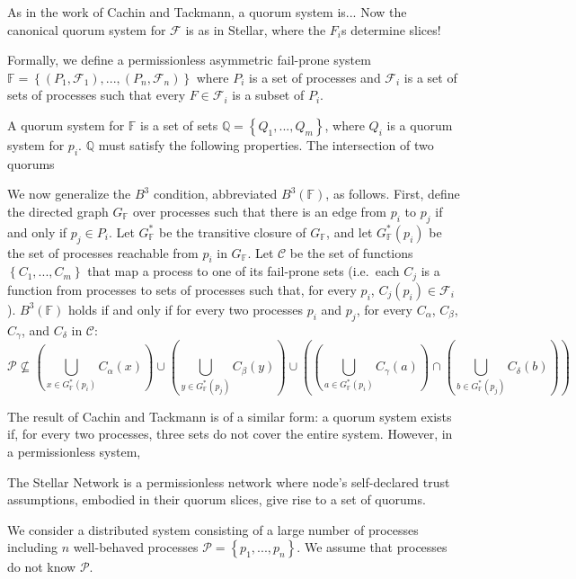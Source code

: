 \documentclass[11pt]{article}
\begin{document}
As in the work of Cachin and Tackmann, a quorum system is... Now the canonical quorum system for $\mathcal{F}$ is as in Stellar, where the $F_i$s determine slices!

Formally, we define a permissionless asymmetric fail-prone system $\mathbb{F}=\left\{\left(P_1,\mathcal{F}_1\right),...,\left(P_n,\mathcal{F}_n\right)\right\}$ where $P_i$ is a set of processes and $\mathcal{F}_i$ is a set of sets of processes such that every $F\in\mathcal{F}_i$ is a subset of $P_i$.

A quorum system for $\mathbb{F}$ is a set of sets $\mathbb{Q}=\left\{Q_1,...,Q_m\right\}$, where $Q_i$ is a quorum system for $p_i$. $\mathbb{Q}$ must satisfy the following properties. The intersection of two quorums

  We now generalize the $B^3$ condition, abbreviated $B^3(\mathbb{F})$, as follows. First, define the directed graph $G_\mathbb{F}$ over processes such that there is an edge from $p_i$ to $p_j$ if and only if $p_j\in P_i$. Let $G_\mathbb{F}^*$ be the transitive closure of $G_\mathbb{F}$, and let $G_\mathbb{F}^*(p_i)$ be the set of processes reachable from $p_i$ in $G_\mathbb{F}$. Let $\mathcal{C}$ be the set of functions $\left\{C_1,...,C_m\right\}$ that map a process to one of its fail-prone sets (i.e.\ each $C_j$ is a function from processes to sets of processes such that, for every $p_i$, $C_j(p_i)\in \mathcal{F}_i$).
  $B^3(\mathbb{F})$ holds if and only if for every two processes $p_i$ and $p_j$, for every $C_\alpha$, $C_\beta$, $C_\gamma$, and $C_\delta$ in $\mathcal{C}$:
  \begin{equation}
    \mathcal{P}\not\subseteq \left(\bigcup_{x \in G_\mathbb{F}^*(p_i)}C_\alpha(x)\right) \cup \left(\bigcup_{y \in G_\mathbb{F}^*(p_j)}C_\beta(y)\right) \cup \left(\left(\bigcup_{a \in G_\mathbb{F}^*(p_i)}C_\gamma(a)\right) \cap \left(\bigcup_{b \in G_\mathbb{F}^*(p_j)}C_\delta(b)\right) \right)
  \end{equation}


The result of Cachin and Tackmann is of a similar form: a quorum system exists if, for every two processes, three sets do not cover the entire system. However, in a permissionless system,


The Stellar Network is a permissionless network where node's self-declared trust assumptions, embodied in their quorum slices, give rise to a set of quorums.

We consider a distributed system consisting of a large number of processes including $n$ well-behaved processes $\mathcal{P}=\left\{p_1,...,p_n\right\}$. We assume that processes do not know $\mathcal{P}$.
\end{document}
